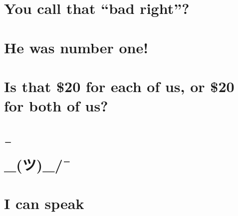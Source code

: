 \chapter{You call that ``bad right''?} %

\chapter{He was number one!} %

\chapter{Is that \$20 for each of us, or \$20 for both of us?} %

\chapter{¯\\_(ツ)_/¯} %

\chapter{I can speak } %


